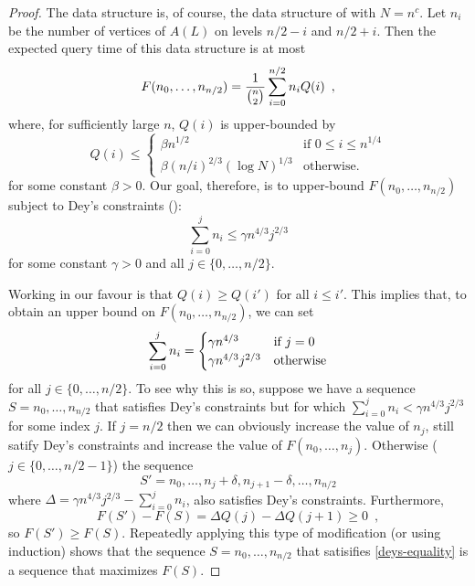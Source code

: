 \documentclass{patmorin}
\begin{document}
\begin{proof}
  The data structure is, of course, the data structure of
   with $N=n^c$.  Let $n_i$ be the number of vertices
  of $A(L)$ on levels $n/2-i$ and $n/2+i$.  Then the expected query time
  of this data structure is at most
  \begin{equation}
    F(n_0,\ldots,n_{n/2}) 
      = \frac{1}{\binom{n}{2}}\sum_{i=0}^{n/2} n_i Q(i) \enspace ,
     \eqlabel{expected}
  \end{equation}
  where, for sufficiently large $n$, $Q(i)$ is upper-bounded by
  \[
        Q(i) \le \begin{cases}
          \beta n^{1/2} & \text{if $0\le i \le n^{1/4}$} \\
          \beta (n/i)^{2/3}(\log N)^{1/3}  & \text{otherwise} .
        \end{cases}
  \]
  for some constant $\beta>0$.   Our goal, therefore, is to upper-bound
  $F(n_0,\ldots,n_{n/2})$ subject to Dey's constraints ():
  \[
     \sum_{i=0}^{j}n_i \le \gamma n^{4/3}j^{2/3} 
  \]
  for some constant $\gamma>0$ and all $j\in\{0,\ldots,n/2\}$.

  Working in our favour is that $Q(i) \ge Q(i')$ for all $i \le i'$.
  This implies that, to obtain an upper bound on $F(n_0,\ldots,n_{n/2})$,
  we can set
  \begin{equation}
      \sum_{i=0}^{j}n_i = 
        \begin{cases}
           \gamma n^{4/3} & \text{if $j=0$} \\
           \gamma n^{4/3}j^{2/3} & \text{otherwise}
        \end{cases}  \eqlabel{deys-equality}
  \end{equation}
  for all $j\in\{0,\ldots,n/2\}$.  To see why this is so, suppose we have
  a sequence $S=n_0,\ldots,n_{n/2}$ that satisfies Dey's constraints
  but for which $\sum_{i=0}^{j}n_i < \gamma n^{4/3}j^{2/3}$ for some index
  $j$. If $j=n/2$ then we can obviously increase the value of $n_j$, still
  satify Dey's constraints and increase the value of $F(n_0,\ldots,n_j)$.
  Otherwise ($j\in\{0,\ldots,n/2-1\}$) the sequence
  \[
     S'=n_0,\ldots,n_{j}+\delta,n_{j+1}-\delta,\ldots,n_{n/2}
  \]
  where $\Delta=\gamma n^{4/3}j^{2/3}-\sum_{i=0}^{j}n_i$, also satisfies
  Dey's constraints.  Furthermore, 
  \[  F(S')-F(S) = \Delta Q(j) - \Delta Q(j+1) \ge 0 \enspace , \]
  so $F(S')\ge F(S)$.  Repeatedly applying this type of modification (or
  using induction) shows that the sequence $S=n_0,\ldots,n_{n/2}$ that
  satisifies \eqref{deys-equality} is a sequence that maximizes $F(S)$.


\end{proof}
\end{document}
